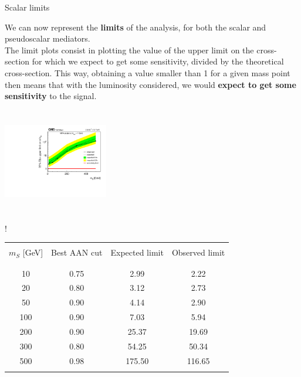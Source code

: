 \documentclass[8 pt]{beamer}
\begin{document}
\begin{frame}{Scalar limits}

	\justifying
	We can now represent the \textbf{limits} of the analysis, for both the scalar and pseudoscalar mediators. \\ \vspace{8pt} The limit plots consist in plotting the value of the upper limit on the cross-section for which we expect to get some sensitivity, divided by the theoretical cross-section. This way, obtaining a value smaller than 1 for a given mass point then means that with the luminosity considered, we would \textbf{expect to get some sensitivity} to the signal. \vfill

	\hspace{4pt}
   \begin{minipage}[c]{.02\linewidth}
	\begin{exampleblock}{}  \end{exampleblock}
   \end{minipage}	
   \hspace{5pt}	
   \begin{minipage}[c]{.40\linewidth}
   	\begin{center}
		\vspace{15pt}
		\includegraphics[width=130pt, height=130pt]{figs/limits_scalar.pdf}
	\end{center}
   \end{minipage} \hfill
    \begin{minipage}[c]{.52\linewidth}
   	\begin{center}
	\resizebox{175pt} {!}{
   	\begin{tabular}{c|c|c|c}
		& & & \\
		$m_S$ [GeV]& Best AAN cut & Expected limit & Observed limit \\ 
		& & & \\ 
		\hline \hline
		& & & \\
		10 & 0.75 & 2.99 & 2.22 \\
            	20 & 0.80 & 3.12 & 2.73 \\
            	50 & 0.90 & 4.14 & 2.90 \\
            	100 & 0.90 & 7.03 & 5.94 \\
            	200 & 0.90 & 25.37 & 19.69 \\
            	300 & 0.80 & 54.25 & 50.34 \\
            	500 & 0.98 & 175.50 & 116.65 \\
		& & & \\
          \end{tabular}
          }
          \end{center}
   \end{minipage} \hfill \vfill
   

\end{frame}
\end{document}
